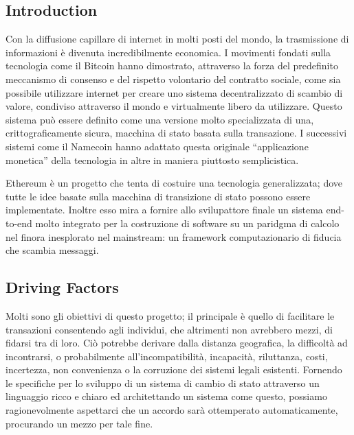 \documentclass[9pt,oneside]{amsart}
\begin{document}
\setlength{\columnsep}{20pt}
\begin{multicols}{2}

\section{Introduction}\label{sec:introduction}

Con la diffusione capillare di internet in molti posti del mondo, la trasmissione di informazioni è divenuta incredibilmente economica. I movimenti fondati sulla tecnologia come il Bitcoin hanno dimostrato, attraverso la forza del predefinito meccanismo di consenso e del rispetto volontario del contratto sociale, come sia possibile utilizzare internet per creare uno sistema decentralizzato di scambio di valore, condiviso attraverso il mondo e virtualmente libero da utilizzare. Questo sistema può essere definito come una versione molto specializzata di una, crittograficamente sicura, macchina di stato basata sulla transazione. I successivi sistemi come il Namecoin hanno adattato questa originale ``applicazione monetica'' della tecnologia in altre in maniera piuttosto semplicistica.

Ethereum è un progetto che tenta di costuire una tecnologia generalizzata; dove tutte le idee basate sulla macchina di transizione di stato possono essere implementate. Inoltre esso mira a fornire allo svilupattore finale un sistema end-to-end molto integrato per la costruzione di software su un paridgma di calcolo nel finora inesplorato nel mainstream: un framework computazionario di fiducia che scambia messaggi.

\subsection{Driving Factors} \label{ch:driving}

Molti sono gli obiettivi di questo progetto; il principale è quello di facilitare le transazioni consentendo agli individui, che altrimenti non avrebbero mezzi, di fidarsi tra di loro. Ciò potrebbe derivare dalla distanza geografica, la difficoltà ad incontrarsi, o probabilmente all'incompatibilità, incapacità, riluttanza, costi, incertezza, non convenienza o la corruzione dei sistemi legali esistenti. Fornendo le specifiche per lo sviluppo di un sistema di cambio di stato attraverso un linguaggio ricco e chiaro ed architettando un sistema come questo, possiamo ragionevolmente aspettarci che un accordo sarà ottemperato automaticamente, procurando un mezzo per tale fine.


\end{multicols}
\end{document}
